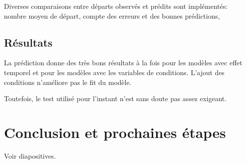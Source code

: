 \documentclass[11pt,a4paper]{article}
\begin{document}
Diverses comparaisons entre départs observés et prédits sont implémentés: nombre moyen de départ, compte des erreurs et des bonnes prédictions, 

\subsection*{Résultats}

La prédiction donne des très bons résultats à la fois pour les modèles avec effet temporel et pour les modèles avec les variables de conditions. L'ajout des conditions n'améliore pas le fit du modèle. 

Toutefois, le test utilisé pour l'instant n'est sans doute pas assez exigeant.  

\section{Conclusion et prochaines étapes}

Voir diapositives. 
\end{document}
